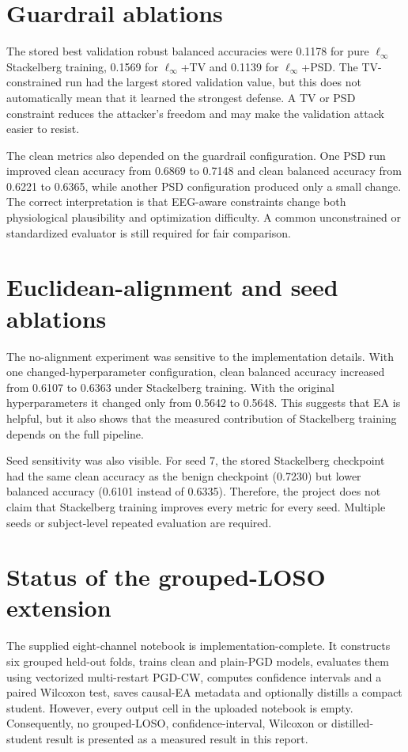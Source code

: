 \documentclass[10pt,a4paper,openright]{report}
\begin{document}
\section{Guardrail ablations}
The stored best validation robust balanced accuracies were 0.1178 for pure $\ell_\infty$ Stackelberg training, 0.1569 for $\ell_\infty$+TV and 0.1139 for $\ell_\infty$+PSD. The TV-constrained run had the largest stored validation value, but this does not automatically mean that it learned the strongest defense. A TV or PSD constraint reduces the attacker's freedom and may make the validation attack easier to resist.

The clean metrics also depended on the guardrail configuration. One PSD run improved clean accuracy from 0.6869 to 0.7148 and clean balanced accuracy from 0.6221 to 0.6365, while another PSD configuration produced only a small change. The correct interpretation is that EEG-aware constraints change both physiological plausibility and optimization difficulty. A common unconstrained or standardized evaluator is still required for fair comparison.

\section{Euclidean-alignment and seed ablations}
The no-alignment experiment was sensitive to the implementation details. With one changed-hyperparameter configuration, clean balanced accuracy increased from 0.6107 to 0.6363 under Stackelberg training. With the original hyperparameters it changed only from 0.5642 to 0.5648. This suggests that EA is helpful, but it also shows that the measured contribution of Stackelberg training depends on the full pipeline.

Seed sensitivity was also visible. For seed 7, the stored Stackelberg checkpoint had the same clean accuracy as the benign checkpoint (0.7230) but lower balanced accuracy (0.6101 instead of 0.6335). Therefore, the project does not claim that Stackelberg training improves every metric for every seed. Multiple seeds or subject-level repeated evaluation are required.

\section{Status of the grouped-LOSO extension}
The supplied eight-channel notebook is implementation-complete. It constructs six grouped held-out folds, trains clean and plain-PGD models, evaluates them using vectorized multi-restart PGD-CW, computes confidence intervals and a paired Wilcoxon test, saves causal-EA metadata and optionally distills a compact student. However, every output cell in the uploaded notebook is empty. Consequently, no grouped-LOSO, confidence-interval, Wilcoxon or distilled-student result is presented as a measured result in this report.
\end{document}
